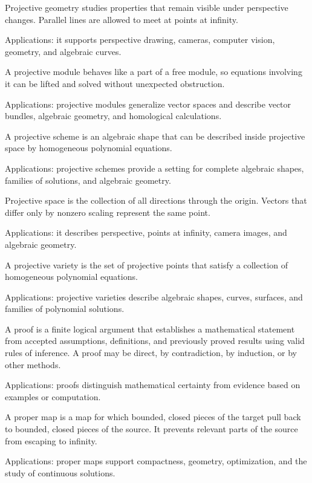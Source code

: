 Projective geometry studies properties that remain visible under perspective changes. Parallel lines are allowed to meet at points at infinity. \par\noindent Applications: it supports perspective drawing, cameras, computer vision, geometry, and algebraic curves.

A projective module behaves like a part of a free module, so equations involving it can be lifted and solved without unexpected obstruction. \par\noindent Applications: projective modules generalize vector spaces and describe vector bundles, algebraic geometry, and homological calculations.

A projective scheme is an algebraic shape that can be described inside projective space by homogeneous polynomial equations. \par\noindent Applications: projective schemes provide a setting for complete algebraic shapes, families of solutions, and algebraic geometry.

Projective space is the collection of all directions through the origin. Vectors that differ only by nonzero scaling represent the same point. \par\noindent Applications: it describes perspective, points at infinity, camera images, and algebraic geometry.

A projective variety is the set of projective points that satisfy a collection of homogeneous polynomial equations. \par\noindent Applications: projective varieties describe algebraic shapes, curves, surfaces, and families of polynomial solutions.

A proof is a finite logical argument that establishes a mathematical statement from accepted assumptions, definitions, and previously proved results using valid rules of inference. A proof may be direct, by contradiction, by induction, or by other methods. \par\noindent Applications: proofs distinguish mathematical certainty from evidence based on examples or computation.

A proper map is a map for which bounded, closed pieces of the target pull back to bounded, closed pieces of the source. It prevents relevant parts of the source from escaping to infinity. \par\noindent Applications: proper maps support compactness, geometry, optimization, and the study of continuous solutions.

